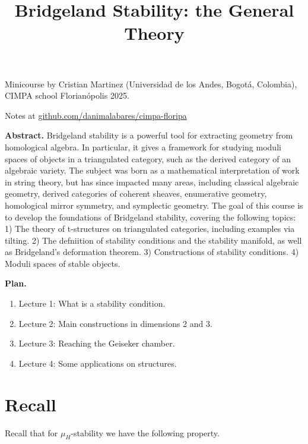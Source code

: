 


\title{Bridgeland Stability: the General Theory}
\maketitle

Minicourse by Cristian Martinez (Universidad de los Andes, Bogotá, Colombia),
 CIMPA school Florianópolis 2025.

Notes at 
\href{http://github.com/danimalabares/cimpa-floripa}
{github.com/danimalabares/cimpa-floripa}

\bigskip\noindent

{\bf Abstract.} Bridgeland stability is a powerful tool for extracting geometry
from homological algebra. In particular, it gives a framework for studying
moduli spaces of objects in a triangulated category, such as the derived
category of an algebraic variety. The subject was born as a mathematical
interpretation of work in string theory, but has since impacted many areas,
including classical algebraic geometry, derived categories of coherent sheaves,
enumerative geometry, homological mirror symmetry, and symplectic geometry. The
goal of this course is to develop the foundations of Bridgeland stability,
covering the following topics: 1) The theory of t-structures on triangulated
categories, including examples via tilting. 2) The defniition of stability
conditions and the stability manifold, as well as Bridgeland’s deformation
theorem. 3) Constructions of stability conditions. 4) Moduli spaces of stable
objects. 

\bigskip\noindent
\tableofcontents
\bigskip\noindent

\noindent
{\bf Plan.}
\begin{enumerate}
\item Lecture 1: What is a stability condition.
\item Lecture 2: Main constructions in dimensions 2 and 3.
\item Lecture 3: Reaching the Geiseker chamber.
\item Lecture 4: Some applications on structures.
\end{enumerate}

\section{Recall}
\label{section-recall}

Recall that for $\mu_H$-stability we have the following property.

